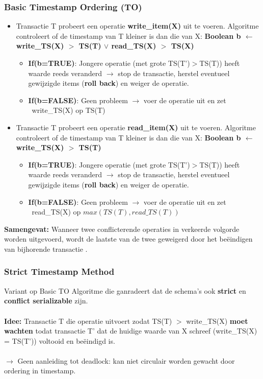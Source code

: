 \subsubsection{Basic Timestamp Ordering (TO)}
\begin{itemize}
	\item 
Transactie T probeert een operatie \textbf{write\_item(X)} uit te voeren. 	Algoritme controleert of de timestamp van T kleiner is dan die van X: 
	\textbf{Boolean b $\leftarrow$ write\_TS(X) $>$ TS(T) $\vee$ read\_TS(X) $>$ TS(X)} \
	\begin{itemize}
		\item \textbf{If(b=TRUE)}: Jongere operatie (met grote TS(T')$>$TS(T)) heeft waarde reeds veranderd $\rightarrow$ stop de transactie, herstel eventueel gewijzigde items (\textbf{roll back}) en weiger de operatie. 
		\item \textbf{If(b=FALSE)}: Geen probleem $\rightarrow$ voer de operatie uit en zet \ write\_TS(X) op TS(T)
	\end{itemize}
	
	\item 
Transactie T probeert een operatie \textbf{read\_item(X)} uit te voeren. 	Algoritme controleert of de timestamp van T kleiner is dan die van X: 
	\textbf{Boolean b $\leftarrow$ write\_TS(X) $>$ TS(T)} \
	\begin{itemize}
		\item \textbf{If(b=TRUE)}: Jongere operatie (met grote TS(T')$>$TS(T)) heeft waarde reeds veranderd $\rightarrow$ stop de transactie, herstel eventueel gewijzigde items (\textbf{roll back}) en weiger de operatie. 
		\item \textbf{If(b=FALSE)}: Geen probleem $\rightarrow$ voer de operatie uit en zet \ read\_TS(X) op $max(TS(T),read\_TS(T))$
	\end{itemize}
\end{itemize}
\textbf{Samengevat:} Wanneer twee conflicterende operaties in verkeerde volgorde worden uitgevoerd, wordt de laatste van de twee geweigerd door het be\"eindigen van bijhorende transactie .

\subsubsection{Strict Timestamp Method}
Variant op Basic TO Algoritme die ganradeert dat de schema's ook \textbf{strict} en \textbf{conflict serializable} zijn.
\\\\
\textbf{Idee:} Transactie T die operatie uitvoert zodat TS(T) $>$ write\_TS(X) \textbf{moet wachten} todat transactie T' dat de huidige waarde van X schreef (write\_TS(X) = TS(T')) voltooid en be\"eindigd is.\\\\
$\rightarrow$ Geen aanleiding tot deadlock: kan niet circulair worden gewacht door ordering in timestamp.

